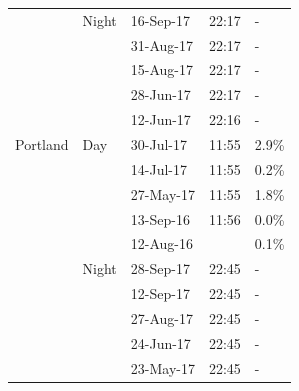 \documentclass[final,3p,times,onecolumn,sort&compress]{elsarticle}
\begin{document}
\begin{table}[H]
\begin{tabular}{ll|lll}
          & Night & 16-Sep-17 & 22:17 & -              \\
          &       & 31-Aug-17 & 22:17 & -              \\
          &       & 15-Aug-17 & 22:17 & -              \\
          &       & 28-Jun-17 & 22:17 & -              \\
          &       & 12-Jun-17 & 22:16 & -              \\
Portland  & Day   & 30-Jul-17 & 11:55 & 2.9\%          \\
          &       & 14-Jul-17 & 11:55 & 0.2\%          \\
          &       & 27-May-17 & 11:55 & 1.8\%          \\
          &       & 13-Sep-16 & 11:56 & 0.0\%          \\
          &       & 12-Aug-16 &       & 0.1\%          \\
          & Night & 28-Sep-17 & 22:45 & -              \\
          &       & 12-Sep-17 & 22:45 & -              \\
          &       & 27-Aug-17 & 22:45 & -              \\
          &       & 24-Jun-17 & 22:45 & -              \\
          &       & 23-May-17 & 22:45 & -             
\end{tabular}
\end{table}
\end{document}
